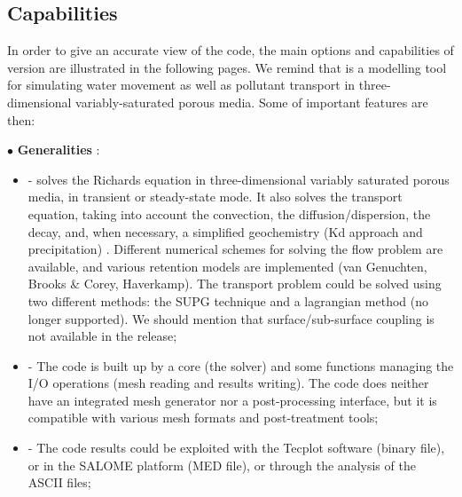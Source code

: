 \subsection{Capabilities}
 In order to give an accurate view of the code,
the main options and capabilities of \estel version \rel are illustrated in the following pages.
% 
We remind that \estel \rel is a modelling tool for simulating water movement as well as pollutant transport in three-dimensional variably-saturated porous media.
Some of \estel important features are then:
%
\begin{list}{-}{}
\item[$\bullet$] \textbf{Generalities} :
%
  \begin {itemize}
% 
    \item [-] \estel \rel solves the Richards equation in three-dimensional variably saturated porous media, in transient or steady-state mode. It also solves the transport equation, taking into account the convection, the diffusion/dispersion, the decay, and, when necessary, a simplified geochemistry (Kd approach and precipitation) \cite{principlenote}. Different numerical schemes for solving the flow problem are available, and various retention models are implemented (van Genuchten, Brooks \& Corey, Haverkamp). The transport problem could be solved using two different methods: the SUPG technique and a lagrangian method (no longer supported). We should mention that surface/sub-surface coupling is not available in the \rel release;

    \item [-] The code is built up by a core (the solver) and some functions managing the I/O operations (mesh reading and results writing). The code does neither have an integrated mesh generator nor a post-processing interface, but it is compatible with various mesh formats and post-treatment tools;

    \item [-] The code results could be exploited with the Tecplot software (binary file), or in the SALOME platform (MED file), or through the analysis of the ASCII files;


\end{itemize}
\end{list}
